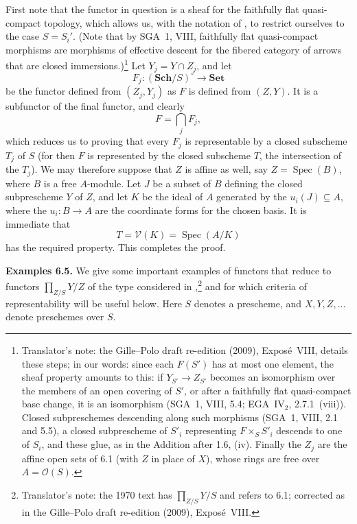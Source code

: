 \smallskip
First note that the functor in question is a sheaf for the faithfully flat
quasi-compact topology, which allows us, with the notation of
, to restrict ourselves to the
case \(S=S_i'\). (Note that by SGA~1, VIII, faithfully flat quasi-compact
morphisms are morphisms of effective descent for the fibered category of
arrows that are closed immersions.)\footnote{Translator's note: the Gille--Polo draft re-edition
(2009), Expos\'e~VIII, details these steps; in our words: since each \(F(S')\) has at most one
element, the sheaf property amounts to this: if \(Y_{S'}\to Z_{S'}\) becomes an isomorphism over the
members of an open covering of \(S'\), or after a faithfully flat quasi-compact base change, it is an
isomorphism (SGA~1, VIII, 5.4; EGA~IV\(_2\), 2.7.1~(viii)). Closed subpreschemes descending along
such morphisms (SGA~1, VIII, 2.1 and 5.5), a closed subprescheme of \(S'_i\) representing
\(F\times_SS'_i\) descends to one of \(S_i\), and these glue, as in the Addition after 1.6, (iv).
Finally the \(Z_j\) are the affine open sets of 6.1 (with \(Z\) in place of \(X\)), whose rings are
free over \(A=\mathcal O(S)\).} Let \(Y_j=Y\cap Z_j\), and let
\[
  F_j:(\mathbf{Sch}/S)^\circ\longrightarrow\mathbf{Set}
\]
be the functor defined from \((Z_j,Y_j)\) as \(F\) is defined from
\((Z,Y)\). It is a subfunctor of the final functor, and clearly
\[
  F=\bigcap_jF_j,
\]
which reduces us to proving that every \(F_j\) is representable by a
closed subscheme \(T_j\) of \(S\) (for then \(F\) is represented by the
closed subscheme \(T\), the intersection of the \(T_j\)). We may therefore
suppose that
\(Z\) is affine as well, say \(Z=\operatorname{Spec}(B)\), where \(B\)
is a free \(A\)-module. Let \(J\) be a subset of \(B\) defining the
closed subprescheme \(Y\) of \(Z\), and let \(K\) be the ideal of \(A\)
generated by the \(u_i(J)\subseteq A\), where the \(u_i:B\to A\) are
the coordinate forms for the chosen basis. It is immediate that
\[
  T=\mathcal V(K)=\operatorname{Spec}(A/K)
\]
has the required property. This completes the proof.

\medskip
\noindent{}\textbf{Examples 6.5.}
We give some important examples of functors that reduce to functors
\(\prod_{Z/S}Y/Z\) of the type considered in
,\footnote{Translator's note: the 1970 text has
\(\prod_{Z/S}Y/S\) and refers to 6.1; corrected as in the Gille--Polo draft re-edition (2009),
Expos\'e~VIII.} and for which criteria of
representability will be useful below. Here \(S\) denotes a prescheme,
and \(X,Y,Z,\ldots\) denote preschemes over \(S\).

